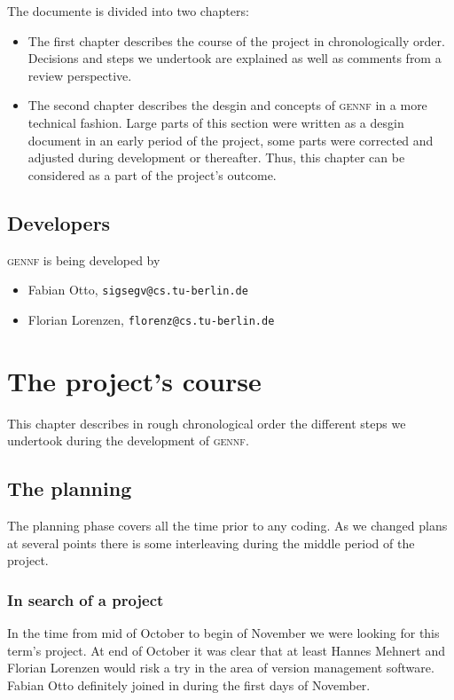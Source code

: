 \documentclass[fleqn, 10pt, a4paper]{report} \usepackage{amssymb}
\newcommand{\GENNF}{\textsc{gennf}}
\begin{document}
The documente is divided into two chapters:
\begin{itemize}
\item The first chapter describes the course of the project in
  chronologically order. Decisions and steps we undertook are
  explained as well as comments from a review perspective.
\item The second chapter describes the desgin and concepts of \GENNF{}
  in a more technical fashion. Large parts of this section were
  written as a desgin document in an early period of the project, some
  parts were corrected and adjusted during development or thereafter.
  Thus, this chapter can be considered as a part of the project's
  outcome.
\end{itemize}

\section*{Developers}

\GENNF{} is being developed by
\begin{itemize}
\item Fabian Otto, \texttt{sigsegv@cs.tu-berlin.de}
\item Florian Lorenzen, \texttt{florenz@cs.tu-berlin.de}
\end{itemize}


\chapter{The project's course \label{course}}

This chapter describes in rough chronological order the different
steps we undertook during the development of \GENNF{}.

\section{The planning}

The planning phase covers all the time prior to any coding. As we
changed plans at several points there is some interleaving during the
middle period of the project.

\subsection{In search of a project}

In the time from mid of October to begin of November we were looking
for this term's project. At end of October it was clear that at least
Hannes Mehnert and Florian Lorenzen would risk a try in the area of
version management software. Fabian Otto definitely joined in during
the first days of November.
\end{document}
